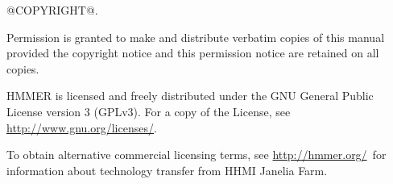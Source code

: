 \vspace*{\fill}
\begin{flushleft}
@COPYRIGHT@.\vspace{5mm}

\vspace{5mm}
Permission is granted to make and distribute verbatim copies of this
manual provided the copyright notice and this permission notice are
retained on all copies.\vspace{5mm}

\vspace{5mm} HMMER is licensed and freely distributed under the GNU
General Public License version 3 (GPLv3). For a copy of the License,
see \url{http://www.gnu.org/licenses/}.

\vspace{5mm}

To obtain alternative commercial licensing terms, see
\url{http://hmmer.org/}\ for information about technology transfer
from HHMI Janelia Farm.

\vspace{5mm}
\end{flushleft}



